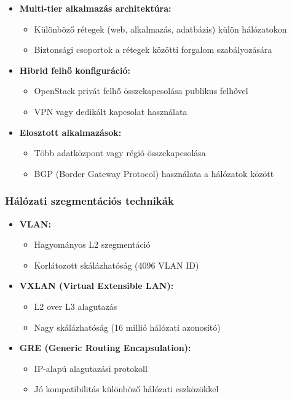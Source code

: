 \documentclass[a4paper,12pt]{article}
\begin{document}
    \begin{itemize}
        \item \textbf{Multi-tier alkalmazás architektúra:}
        \begin{itemize}
            \item Különböző rétegek (web, alkalmazás, adatbázis) külön hálózatokon
            \item Biztonsági csoportok a rétegek közötti forgalom szabályozására
        \end{itemize}

        \item \textbf{Hibrid felhő konfiguráció:}
        \begin{itemize}
            \item OpenStack privát felhő összekapcsolása publikus felhővel
            \item VPN vagy dedikált kapcsolat használata
        \end{itemize}

        \item \textbf{Elosztott alkalmazások:}
        \begin{itemize}
            \item Több adatközpont vagy régió összekapcsolása
            \item BGP (Border Gateway Protocol) használata a hálózatok között
        \end{itemize}
    \end{itemize}

    \subsubsection{Hálózati szegmentációs technikák}

    \begin{itemize}
        \item \textbf{VLAN:}
        \begin{itemize}
            \item Hagyományos L2 szegmentáció
            \item Korlátozott skálázhatóság (4096 VLAN ID)
        \end{itemize}

        \item \textbf{VXLAN (Virtual Extensible LAN):}
        \begin{itemize}
            \item L2 over L3 alagutazás
            \item Nagy skálázhatóság (16 millió hálózati azonosító)
        \end{itemize}

        \item \textbf{GRE (Generic Routing Encapsulation):}
        \begin{itemize}
            \item IP-alapú alagutazási protokoll
            \item Jó kompatibilitás különböző hálózati eszközökkel
        \end{itemize}
    \end{itemize}
\end{document}
